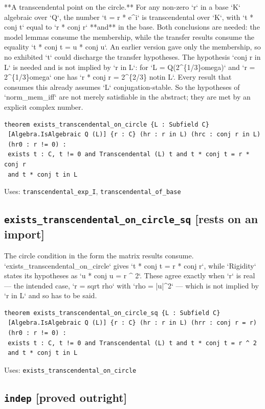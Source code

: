 \documentclass[11pt,a4paper]{article}
\newcommand{\tagon}{\textcolor{onaxc}{\textbf{[rests on an import]}}}
\newcommand{\tagpr}{\textcolor{provedc}{\textbf{[proved outright]}}}
\begin{document}
**A transcendental point on the circle.** For any non-zero `r` in a base `K` algebraic over `Q`, the number `t = r * e\^{}i` is transcendental over `K`, with `t * conj t` equal to `r * conj r` **and** in the base. Both conclusions are needed: the model lemmas consume the membership, while the transfer results consume the equality `t * conj t = u * conj u`. An earlier version gave only the membership, so no exhibited `t` could discharge the transfer hypotheses. The hypothesis `conj r in L` is needed and is not implied by `r in L`: for `L = Q(2\^{}\{1/3\}omega)` and `r = 2\^{}\{1/3\}omega` one has `r * conj r = 2\^{}\{2/3\} notin L`. Every result that consumes this already assumes `L` conjugation-stable. So the hypotheses of `norm\_mem\_iff` are not merely satisfiable in the abstract; they are met by an explicit complex number.

\begin{lstlisting}
theorem exists_transcendental_on_circle {L : Subfield C}
 [Algebra.IsAlgebraic Q (L)] {r : C} (hr : r in L) (hrc : conj r in L)
 (hr0 : r != 0) :
 exists t : C, t != 0 and Transcendental (L) t and t * conj t = r * conj r
 and t * conj t in L
\end{lstlisting}
\noindent\footnotesize Uses: \texttt{transcendental\_exp\_I}, \texttt{transcendental\_of\_base}\normalsize


\subsection*{\texttt{exists\_transcendental\_on\_circle\_sq} \hfill \tagon}

The circle condition in the form the matrix results consume. `exists\_transcendental\_on\_circle` gives `t * conj t = r * conj r`, while `Rigidity` states its hypotheses as `u * conj u = r \^{} 2`. These agree exactly when `r` is real --- the intended case, `r = sqrt rho` with `rho = |u|\^{}2` --- which is not implied by `r in L` and so has to be said.

\begin{lstlisting}
theorem exists_transcendental_on_circle_sq {L : Subfield C}
 [Algebra.IsAlgebraic Q (L)] {r : C} (hr : r in L) (hrr : conj r = r)
 (hr0 : r != 0) :
 exists t : C, t != 0 and Transcendental (L) t and t * conj t = r ^ 2
 and t * conj t in L
\end{lstlisting}
\noindent\footnotesize Uses: \texttt{exists\_transcendental\_on\_circle}\normalsize


\subsection*{\texttt{indep} \hfill \tagpr}
\end{document}

